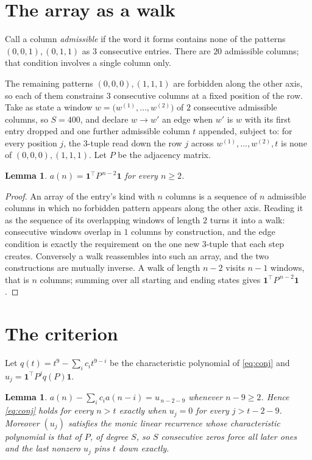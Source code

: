 \documentclass[11pt,a4paper]{article}
\theoremstyle{plain}
\newtheorem{lemma}[theorem]{Lemma}
\theoremstyle{definition}
\begin{document}
\section{The array as a walk}

Call a column \emph{admissible} if the word it forms contains none of the patterns
$(0,0,1), (0,1,1)$ as $3$ consecutive entries. There are $20$ admissible columns; that condition
involves a single column only.

The remaining patterns $(0,0,0), (1,1,1)$ are forbidden along the other axis, so each of them
constrains $3$ consecutive columns at a fixed position of the row. Take as state a
window $w=\bigl(w^{(1)},\dots,w^{(2)}\bigr)$ of $2$ consecutive admissible
columns, so $S=400$, and declare $w\to w'$ an edge when $w'$ is $w$ with its first entry
dropped and one further admissible column $t$ appended, subject to: for every position
$j$, the $3$-tuple read down the row $j$ across $w^{(1)},\dots,w^{(2)},t$
is none of $(0,0,0), (1,1,1)$. Let $P$ be the adjacency matrix.

\begin{lemma}\label{lem:walk}
$a(n)=\mathbf{1}^{\!\top}P^{\,n-2}\mathbf{1}$ for every $n\ge2$.
\end{lemma}

\begin{proof}
An array of the entry's kind with $n$ columns is a sequence of $n$ admissible columns in
which no forbidden pattern appears along the other axis. Reading it as the sequence of its
overlapping windows of length $2$ turns it into a walk: consecutive windows overlap in
$1$ columns by construction, and the edge condition is exactly the requirement on the one
new $3$-tuple that each step creates. Conversely a walk reassembles into such an array,
and the two constructions are mutually inverse. A walk of length $n-2$ visits $n-1$
windows, that is $n$ columns; summing over all starting and ending states gives
$\mathbf{1}^{\!\top}P^{\,n-2}\mathbf{1}$.
\end{proof}

\section{The criterion}

Let $q(t)=t^{9}-\sum_i c_i t^{9-i}$ be the characteristic polynomial of
\eqref{eq:conj} and $u_j=\mathbf{1}^{\!\top}P^{j}q(P)\mathbf{1}$.

\begin{lemma}\label{lem:crit}
$a(n)-\sum_i c_i a(n-i)=u_{\,n-2-9}$ whenever $n-9\ge2$. Hence
\eqref{eq:conj} holds for every $n>t$ exactly when $u_j=0$ for every
$j>t-2-9$. Moreover $(u_j)$ satisfies the monic linear recurrence whose
characteristic polynomial is that of $P$, of degree $S$, so $S$ consecutive zeros force all
later ones and the last nonzero $u_j$ pins $t$ down exactly.
\end{lemma}
\end{document}
